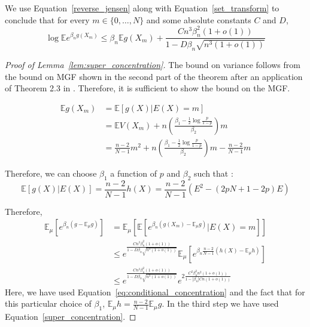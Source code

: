 \documentclass[final,12pt]{colt2018}
\begin{document}
We use Equation~\eqref{reverse_jensen} along with Equation~\eqref{set_transform} to conclude that for every $ m  \in \{0,\dots,N\}$ and some absolute constants $C$ and $D$,
\begin{equation} 
 \log\mathbb{E}e^{\beta_n g(X_m) } \leq \beta_n \mathbb{E}g(X_m) + \frac{Cn^3\beta_n^2(1+o(1))}{ 1 - D\beta_n\sqrt{n^3(1+o(1))}}
 \label{eq:conditional_concentration}
 \end{equation}




\begin{proof}[Proof of Lemma~\ref{lem:super_concentration}]
The bound on variance follows from the bound on MGF shown in the second part of the theorem after an application of Theorem 2.3 in \citet{boucheron2013concentration}. Therefore, it is sufficient to show the bound on the MGF.

\begin{align*}
\mathbb{E} g(X_m) &=  \mathbb{E}[g(X)| E(X) = m] \\
&= \mathbb{E}V(X_m) + n\left(\frac{\beta_1 -\frac{1}{2}\log{\frac{p}{1-p}}}{\beta_2}\right)m \\
&= \frac{n-2}{N-1}m^2 + n\left(\frac{\beta_1 -\frac{1}{2}\log{\frac{p}{1-p}}}{\beta_2}\right)m - \frac{n-2}{N-1}m
\end{align*}

Therefore, we can choose $\beta_1 $ a function of $p$ and $\beta_2$ such that :
$$\mathbb{E}[g(X)| E(X)] = \frac{n-2}{N-1}h(X) =  \frac{n-2}{N-1} \left(E^2 - (2pN +1 - 2p)E\right)$$

Therefore, 
\begin{align*}
\mathbb{E}_{\mu} \left[e^{\beta_n(g - \mathbb{E}_{\mu}g)}\right] &= \mathbb{E}_{\mu}\left[ \mathbb{E}\left[e^{\beta_n(g(X_m) - \mathbb{E}_{\mu}g)}\Big \rvert E(X) = m  \right]\right] \\
&\leq e^{\frac{Cn^3\beta_n^2(1+o(1))}{ 1 - D\beta_n\sqrt{n^3(1+o(1))}}}
\mathbb{E}_{\mu}\left[e^{\beta_n\frac{n-2}{N-1} (h(X)- \mathbb{E}_{\mu}h)}\right] \\
&\leq e^{\frac{Cn^3\beta_n^2(1+o(1))}{ 1 - D\beta_n\sqrt{n^3(1+o(1))}}} e^{ 2 \frac{C^2 \beta_n^2 n^2(1+o(1))}{1-|\beta_n|Cn(1+o(1))}}
\end{align*}
Here, we have used Equation~\eqref{eq:conditional_concentration}  and the fact that for this particular choice of $\beta_1$, $\mathbb{E}_{\mu} h = \frac{n-2}{N-1}\mathbb{E}_{\mu} g$. In the third step we have used Equation~\eqref{super_concentration}.
\end{proof}
\end{document}
